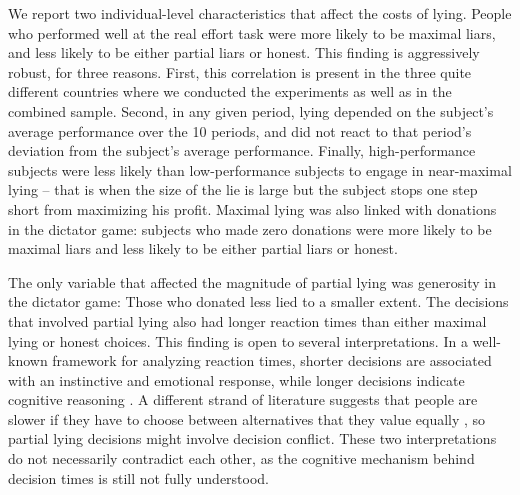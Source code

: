 \documentclass[12pt]{article}
\begin{document}
\par We report two individual-level characteristics that affect the costs of lying. People who performed well at the real effort task were more likely to be maximal liars, and less likely to be either partial liars or honest.\footnotemark{} This finding is aggressively robust, for three reasons. 
First, this correlation is present in the three quite different countries where we conducted the experiments as well as in the combined sample. Second, in any given period, lying depended on the subject's average performance over the 10 periods, and did not react to that period's deviation from the subject's average performance. Finally, high-performance subjects were less likely than low-performance subjects to engage in near-maximal lying -- that is when the size of the lie is large but the subject stops one step short from maximizing his profit. Maximal lying was also linked with donations in the dictator game: subjects who made zero donations were more likely to be maximal liars and less likely to be either partial liars or honest. 

\par The only variable that affected the magnitude of partial lying was generosity in the dictator game: Those who donated less lied to a smaller extent. The decisions that involved partial lying also had longer reaction times than either maximal lying or honest choices. This finding is open to several interpretations. In a well-known framework for analyzing reaction times, shorter decisions are associated with an instinctive and emotional response, while longer decisions indicate cognitive reasoning \citep{rubinstein2007instinctive}. A different strand of literature suggests that people are slower if they have to choose between alternatives that they value equally \citep{KonovalovKrajbich2017}, so partial lying decisions might involve decision conflict. These two interpretations do not necessarily contradict each other, as the cognitive mechanism behind decision times is still not fully understood.\footnotemark{} 
\end{document}
